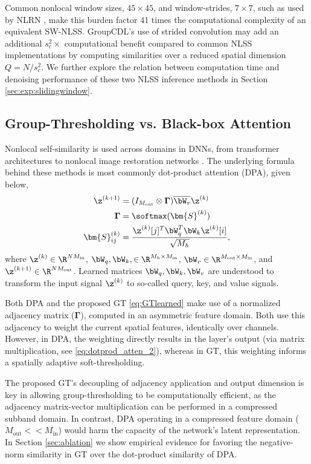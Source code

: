 \documentclass[lettersize,journal]{IEEEtran}
\newcommand{\ADJMAT}{\boldsymbol{\Gamma}}
\newcommand{\SIMMAT}{\bm{S}}
\begin{document}
Common nonlocal window sizes, $45 \times 45$,  and window-strides, $7
\times 7$, such as used by NLRN \cite{liu2018non}, make this burden factor 41 times the
computational complexity of an equivalent SW-NLSS. GroupCDL's use of strided
convolution may add an additional $s_c^2 \times$  computational benefit compared
to common NLSS implementations by computing similarities over a reduced spatial
dimension $Q = N/s_c^2$. We further explore the relation between computation
time and denoising performance of these two NLSS inference methods in Section
\ref{sec:exp:slidingwindow}.

\subsection{Group-Thresholding vs. Black-box Attention}
Nonlocal self-similarity is used across domains in DNNs, from transformer
architectures \cite{dao2022flashattention} to nonlocal image restoration networks
\cite{liu2018non, zhang2019residual}. The underlying formula behind these methods is most commonly dot-product attention (DPA), given below,
\begin{align} \label{eq:dotprod_atten_2}
    \z^{(k+1)} &= (I_{M_{\mathrm{out}}} \otimes \ADJMAT) \overline{\bW_v} \z^{(k)} \\
    \ADJMAT &= \softmax(\SIMMAT^{(k)}) \\
    \SIMMAT^{(k)}_{ij} &= \frac{\z^{(k)}[j]^T \bW_q^T \bW_k
    \z^{(k)}[i]}{\sqrt{M_{h}}}, \label{eq:dot_sim}
\end{align}
where $\z^{(k)} \in \R^{NM_{\mathrm{in}}}$, $\bW_q, \bW_k, \in \R^{M_{h} \times M_{\mathrm{in}}}$,
$\bW_v \in \R^{M_{\mathrm{out}} \times M_{\mathrm{in}}}$, and $\z^{(k+1)} \in \R^{NM_{\mathrm{out}}}$. 
Learned matrices $\bW_q, \bW_k, \bW_v$ are understood to transform the input signal
$\z^{(k)}$ to so-called query, key, and value signals. 

Both DPA and the proposed GT \eqref{eq:GTlearned} make use of a normalized adjacency matrix
($\ADJMAT$), computed in an asymmetric feature domain. Both use this adjacency
to weight the current spatial features, identically over channels. However, in
DPA, the weighting directly results in the layer's output (via matrix
multiplication, see \eqref{eq:dotprod_atten_2}), whereas in GT, this weighting informs a spatially adaptive
soft-thresholding. 

The proposed GT's decoupling of adjacency application and output dimension is key in allowing
group-thresholding to be computationally efficient, as the adjacency
matrix-vector multiplication can be performed in a compressed subband domain. In contrast,
DPA operating in a compressed feature domain ($M_{\mathrm{out}} << M_{\mathrm{in}}$) would harm the
capacity of the network's latent representation. In Section
\ref{sec:ablation} we show empirical evidence for favoring the negative-norm
similarity in GT over the dot-product similarity of DPA.
\end{document}
